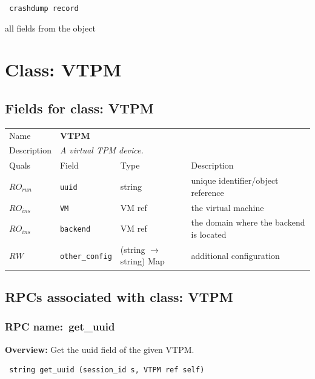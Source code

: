 \vspace{0.3cm}

{\tt 
crashdump record
}


all fields from the object
\vspace{0.3cm}
\vspace{0.3cm}
\vspace{0.3cm}

\vspace{1cm}
\newpage
\section{Class: VTPM}
\subsection{Fields for class: VTPM}
\begin{longtable}{|lllp{}|}
\hline
\multicolumn{1}{|l}{Name} & \multicolumn{3}{l|}{\bf VTPM} \\
\multicolumn{1}{|l}{Description} & \multicolumn{3}{l|}{\parbox{11cm}{\em A
virtual TPM device.}} \\
\hline
Quals & Field & Type & Description \\
\hline
$\mathit{RO}_\mathit{run}$ &  {\tt uuid} & string & unique identifier/object reference \\
$\mathit{RO}_\mathit{ins}$ &  {\tt VM} & VM ref & the virtual machine \\
$\mathit{RO}_\mathit{ins}$ &  {\tt backend} & VM ref & the domain where the backend is located \\
$\mathit{RW}$ &  {\tt other\_config} & (string $\rightarrow$ string) Map & additional configuration \\
\hline
\end{longtable}
\subsection{RPCs associated with class: VTPM}
\subsubsection{RPC name:~get\_uuid}

{\bf Overview:} 
Get the uuid field of the given VTPM.

\begin{verbatim} string get_uuid (session_id s, VTPM ref self)\end{verbatim}


